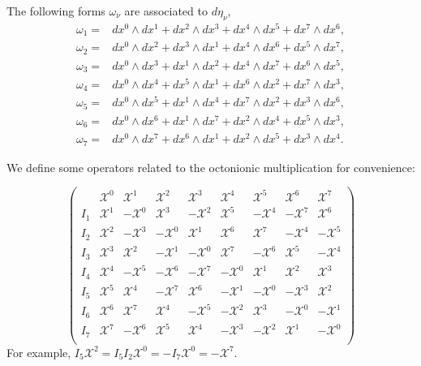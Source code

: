 \documentclass[10pt,a4paper]{amsart}
\numberwithin{equation}{section}
\begin{document}
The following forms $\omega_\nu$ are associated to $d\eta_\nu$,
\small{\begin{align*}
    \omega_1=& dx^0\wedge dx^1+dx^2\wedge dx^3+dx^4\wedge dx^5+dx^7\wedge dx^6,\\
    \omega_2=&dx^0\wedge dx^2+dx^3\wedge dx^1+dx^4\wedge dx^6+dx^5\wedge dx^7,\\
    \omega_3=&dx^0\wedge dx^3+dx^1\wedge dx^2+dx^4\wedge dx^7+dx^6\wedge dx^5,\\
    \omega_4=&dx^0\wedge dx^4+dx^5\wedge dx^1+dx^6\wedge dx^2+dx^7\wedge dx^3,\\
    \omega_5=&dx^0\wedge dx^5+dx^1\wedge dx^4+dx^7\wedge dx^2+dx^3\wedge dx^6,
    \\\omega_6=&dx^0\wedge dx^6+dx^1\wedge dx^7+dx^2\wedge dx^4+dx^5\wedge dx^3,
    \\  
    \omega_7=&dx^0\wedge dx^7+dx^6\wedge dx^1+dx^2\wedge dx^5+dx^3\wedge dx^4.   \end{align*}}

We define some operators related to the octonionic multiplication for convenience:

   
\begin{equation*}
   \left(
    \begin{array}{ccccccccc}
&\mathscr{X}^0&\mathscr{X}^1&\mathscr{X}^2& \mathscr{X}^3& \mathscr{X}^4&\mathscr{X}^5& \mathscr{X}^6& \mathscr{X}^7\\ 
I_1&\mathscr{X}^1&-\mathscr{X}^0&\mathscr{X}^3& -\mathscr{X}^2& \mathscr{X}^5&-\mathscr{X}^4& -\mathscr{X}^7& \mathscr{X}^6\\ 
I_2&\mathscr{X}^2&-\mathscr{X}^3&-\mathscr{X}^0& \mathscr{X}^1& \mathscr{X}^6&\mathscr{X}^7& -\mathscr{X}^4& -\mathscr{X}^5\\ 
I_3&\mathscr{X}^3&\mathscr{X}^2&-\mathscr{X}^1& -\mathscr{X}^0& \mathscr{X}^7&-\mathscr{X}^6& \mathscr{X}^5& -\mathscr{X}^4\\ 
I_4&\mathscr{X}^4&-\mathscr{X}^5&-\mathscr{X}^6& -\mathscr{X}^7& -\mathscr{X}^0&\mathscr{X}^1& \mathscr{X}^2& \mathscr{X}^3\\
I_5&\mathscr{X}^5&\mathscr{X}^4&-\mathscr{X}^7& \mathscr{X}^6& -\mathscr{X}^1&-\mathscr{X}^0& -\mathscr{X}^3& \mathscr{X}^2\\ 
I_6&\mathscr{X}^6&\mathscr{X}^7&\mathscr{X}^4& -\mathscr{X}^5& -\mathscr{X}^2&\mathscr{X}^3& -\mathscr{X}^0& -\mathscr{X}^1\\ 
I_7&\mathscr{X}^7&-\mathscr{X}^6&\mathscr{X}^5& \mathscr{X}^4& -\mathscr{X}^3&-\mathscr{X}^2& \mathscr{X}^1& -\mathscr{X}^0\\ 
\end{array}
    \right)
    \end{equation*}
For example, $I_5\mathscr{X}^2=I_5I_2\mathscr{X}^0=-I_7\mathscr{X}^0=-\mathscr{X}^7$. 
\end{document}
